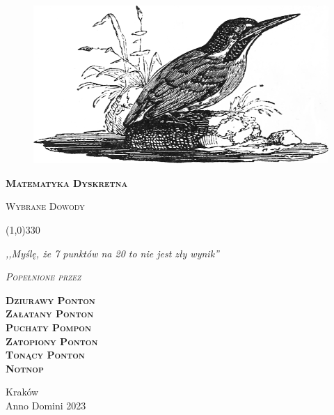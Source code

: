 \begin{titlepage} 

    \begin{center}
         \begin{figure}[h]
            \centering
            \includegraphics[scale=0.35]{images/Alycon.png}
        \end{figure}
        \vspace{0.5cm}
        \Huge
        \textbf{\textsc{Matematyka Dyskretna}}
        
        \vspace{0.5cm}
        \Large
        \textsc{Wybrane Dowody}
        
        \normalsize
        
        
        \line(1,0){330}
        
        \vspace{1cm}
        \textit{,,Myślę, że 7 punktów na 20 to nie jest zły wynik''}
        \vspace{1cm}

        \textit{\textsc{Popełnione przez}}\\
        \vspace{5mm}

        \textbf{\textsc{Dziurawy Ponton \\ Załatany Ponton \\ Puchaty Pompon \\ Zatopiony Ponton \\ Tonący Ponton \\ Notnop}}

        \vfill

        Kraków \\
        Anno Domini 2023
        
    \end{center}
    
\end{titlepage}
